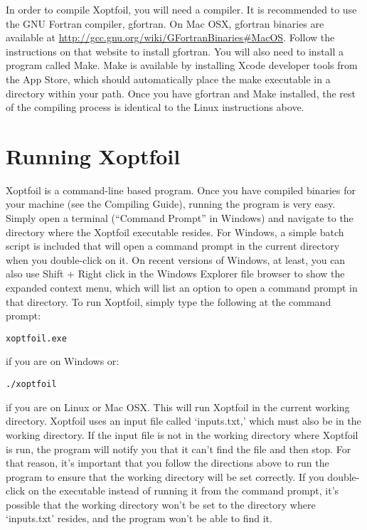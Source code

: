 \documentclass[11pt]{article}
\begin{document}
In order to compile Xoptfoil, you will need a compiler.  It is recommended to use the GNU
Fortran compiler, gfortran.  On Mac OSX, gfortran binaries are available at 
\url{http://gcc.gnu.org/wiki/GFortranBinaries#MacOS}.  Follow the instructions on that
website to install gfortran.  You will also need to install a program called Make.  Make
is available by installing Xcode developer tools from the App Store, which should
automatically place the make executable in a directory within your path. Once you have
gfortran and Make installed, the rest of the compiling process is identical to the Linux
instructions above.

\section{Running Xoptfoil}\label{sec:running}

Xoptfoil is a command-line based program.  Once you have compiled binaries for your
machine (see the Compiling Guide), running the program is very easy.  Simply open a
terminal (``Command Prompt'' in Windows) and navigate to the directory where the Xoptfoil
executable resides.  For Windows, a simple batch script is included that will open a
command prompt in the current directory when you double-click on it.  On recent versions
of Windows, at least, you can also use Shift + Right click in the Windows Explorer file
browser to show the expanded context menu, which will list an option to open a command 
prompt in that directory. To run Xoptfoil, simply type the following at the command 
prompt:

\begin{verbatim}
xoptfoil.exe
\end{verbatim}

\noindent if you are on Windows or:

\begin{verbatim}
./xoptfoil
\end{verbatim}

\noindent if you are on Linux or Mac OSX.  This will run Xoptfoil in the current working
directory.  Xoptfoil uses an input file called `inputs.txt,' which must also be in the
working directory.  If the input file is not in the working directory where Xoptfoil is
run, the program will notify you that it can't find the file and then stop.  For that
reason, it's important that you follow the directions above to run the program to ensure
that the working directory will be set correctly.  If you double-click on the executable
instead of running it from the command prompt, it's possible that the working directory
won't be set to the directory where `inputs.txt' resides, and the program won't be able to
find it.
\end{document}
